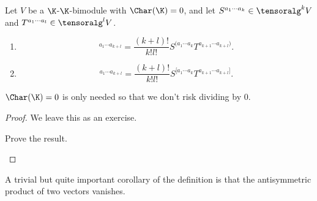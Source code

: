 \begin{prp}{}{}
	Let $V$ be a $\K$-$\K$-bimodule with $\Char (\K )=0$, and let $S^{a_1\cdots a_k}\in \tensoralg ^kV$ and $T^{a_1\cdots a_l}\in \tensoralg ^lV$.
	\begin{enumerate}
		\item
		\intomargin
		\begin{equation}
			[S\vee T]^{a_1\cdots a_{k+l}}=\frac{(k+l)!}{k!l!}S^{(a_1\cdots a_k}T^{a_{k+1}\cdots a_{k+l})}.
		\end{equation}
		\item
		\intomargin
		\begin{equation}
			[S\wedge T]^{a_1\cdots a_{k+l}}=\frac{(k+l)!}{k!l!}S^{[a_1\cdots a_k}T^{a_{k+1}\cdots a_{k+l}]}.
		\end{equation}
	\end{enumerate}
	\begin{rmk}
		$\Char (\K )=0$ is only needed so that we don't risk dividing by $0$.
	\end{rmk}
	\begin{proof}
		We leave this as an exercise.
		\begin{exr}[breakable=false]{}{}
			Prove the result.
		\end{exr}
	\end{proof}
\end{prp}
A trivial but quite important corollary of the definition is that the antisymmetric product of two vectors vanishes.

